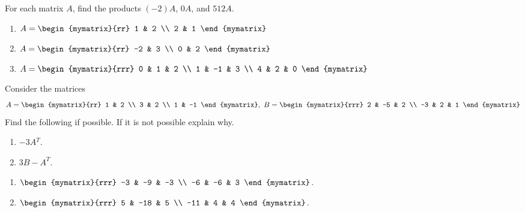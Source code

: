 \documentclass{ximera}
\begin{document}
\begin{problem}
  For each matrix $A$, find the products $(-2)A$, $0A$, and $512A$.
  \begin{enumerate}
  \item
    $A = \begin{mymatrix}{rr}
      1 & 2 \\
      2 & 1
    \end{mymatrix}$
  \item
    $A = \begin{mymatrix}{rr}
      -2 & 3 \\
      0 & 2
    \end{mymatrix}$
  \item
    $A = \begin{mymatrix}{rrr}
      0 & 1 & 2 \\
      1 & -1 & 3 \\
      4 & 2 & 0
    \end{mymatrix}$
  \end{enumerate}
\end{problem}


\begin{problem}
  Consider the matrices
  \begin{equation*}
    A =\begin{mymatrix}{rr}
      1 & 2 \\
      3 & 2 \\
      1 & -1
    \end{mymatrix},
    \quad
    B=\begin{mymatrix}{rrr}
      2 & -5 & 2 \\
      -3 & 2 & 1
    \end{mymatrix}
  \end{equation*}
  Find the following if possible. If it is not possible explain why.
  \begin{enumerate}
  \item $-3A{^T}$.
  \item $3B - A^T$.
  \end{enumerate}

  \begin{sol}
    \begin{enumerate}
    \item $\begin{mymatrix}{rrr}
        -3 & -9 & -3 \\
        -6 & -6 & 3
      \end{mymatrix}$.
    \item $\begin{mymatrix}{rrr}
        5 & -18 & 5 \\
        -11 & 4 & 4
      \end{mymatrix}$.
    \end{enumerate}
  \end{sol}
\end{problem}
\end{document}
